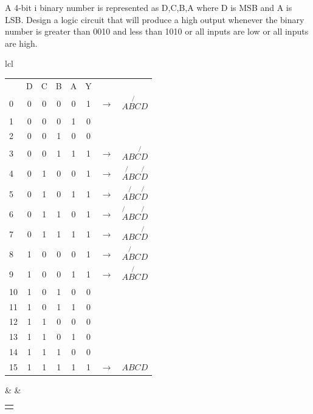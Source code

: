 \vspace{2em}
A 4-bit i binary number is represented as D,C,B,A where D is MSB and A is LSB. Design a logic circuit that will produce a high output whenever the binary number is greater than 0010 and less than 1010 or all inputs are low or all inputs are high.


\vspace{1em}
\Solution
\begin{tabular}{lcl}
   \begin{adjustbox}{valign=t}
      \begin{tabularx}{7cm}{l|C|C|C|C|C|cl}
         & D & C & B & A & Y \\
         0 & 0 & 0 & 0 & 0 & 1
         & $\to$ & $\not{ABCD}$ \\
         1 & 0 & 0 & 0 & 1 & 0 \\
         \color{keyword}
         2 & 0 & 0 & 1 & 0 & 0 \\
         3 & 0 & 0 & 1 & 1 & 1
         & $\to$ & $AB\not{CD}$ \\
         4 & 0 & 1 & 0 & 0 & 1
         & $\to$ & $\not{AB}C\not{D}$ \\
         5 & 0 & 1 & 0 & 1 & 1
         & $\to$ & $A\not{B}C\not{D}$ \\
         6 & 0 & 1 & 1 & 0 & 1
         & $\to$ & $\not{A}BC\not{D}$ \\
         7 & 0 & 1 & 1 & 1 & 1
         & $\to$ & $ABC\not{D}$ \\
         8 & 1 & 0 & 0 & 0 & 1
         & $\to$ & $\not{ABC}D$ \\
         9 & 1 & 0 & 0 & 1 & 1
         & $\to$ & $A\not{BC}D$ \\
         \color{keyword}
         10 & 1 & 0 & 1 & 0 & 0 \\
         11 & 1 & 0 & 1 & 1 & 0 \\
         12 & 1 & 1 & 0 & 0 & 0 \\
         13 & 1 & 1 & 0 & 1 & 0 \\
         14 & 1 & 1 & 1 & 0 & 0 \\
         15 & 1 & 1 & 1 & 1 & 1
         & $\to$ & $ABCD$ \\
      \end{tabularx}
   \end{adjustbox}
   & \hspace{2cm} &
   \begin{adjustbox}{valign=t}
      \begin{tabular}{l}
         \\[2em]
         \begin{Karnaugh}[4][D][C][B][A]
            \minterms{0,3,4,5,6,7,8,9,15}
            \implicant{4}{6}
            \implicant{0}{4}
            \implicant{3}{7}
            \implicant{7}{15}
            \implicant{8}{9}
      

\end{Karnaugh}
\end{tabular}
\end{adjustbox}
\end{tabular}
